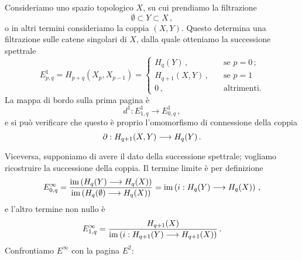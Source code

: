 


\begin{ex}
	Consideriamo uno spazio topologico $X$, su cui prendiamo la filtrazione
	\begin{equation*}
		\emptyset \subset Y \subset X\,,
	\end{equation*}
	o in altri termini consideriamo la coppia $(X,Y)$.
	Questo determina una filtrazione sulle catene singolari di $X$,
	dalla quale otteniamo la successione spettrale
	\begin{equation*}
		E^{1}_{p,q} = H_{p+q}(X_{p},X_{p-1}) = 
		\begin{cases}
			H_{q}(Y) \,, \quad &\text{se } p=0\,; \\
			H_{q+1}(X,Y) \,, \quad &\text{se } p=1\,\\
			0\,, \quad &\text{altrimenti.}
		\end{cases}
	\end{equation*}
	La mappa di bordo sulla prima pagina è
	\begin{equation*}
		d^{1}: E^{1}_{1,q} \longrightarrow E^{1}_{0,q}\,,
	\end{equation*}
	e si può verificare che questo è proprio l'omomorfismo di connessione della coppia
	\begin{equation*}
		\partial : H_{q+1}(X,Y) \longrightarrow H_{q}(Y)\,.
	\end{equation*}
	
	Viceversa, supponiamo di avere il dato della successione spettrale;
	vogliamo ricostruire la successione della coppia.
	Il termine limite è per definizione
	\begin{equation*}
		E^{\infty}_{0,q} =
		\frac{\operatorname{im} \left( H_{q}(Y) \longrightarrow H_{q}(X) \right)}{\operatorname{im} \left( H_{q}(\emptyset) \longrightarrow H_{q}(X) \right)}
		= \operatorname{im} \left( i: H_{q}(Y) \longrightarrow H_{q}(X) \right)\,,
	\end{equation*}
	e l'altro termine non nullo è
	\begin{equation*}
		E^{\infty}_{1,q} = \frac{H_{q+1}(X)}{\operatorname{im} \left( i: H_{q+1}(Y) \longrightarrow H_{q+1}(X) \right)}\,.
	\end{equation*}
	Confrontiamo $E^{\infty}$ con la pagina $E^{2}$:
\end{ex}




